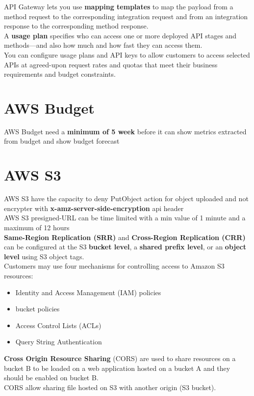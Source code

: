 \documentclass[12pt, letterpaper, twoside]{article}
\begin{document}
API Gateway lets you use \textbf{mapping templates} to map the payload from a method request to the corresponding integration request and 
from an integration response to the corresponding method response.\\

A \textbf{usage plan} specifies who can access one or more deployed API stages and methods—and also how much and how fast they can access them.\\ 
You can configure usage plans and API keys to allow customers to access selected APIs at agreed-upon request rates and quotas 
that meet their business requirements and budget constraints.\\

\section{AWS Budget}
AWS Budget need a \textbf{minimum of 5 week} before it can show metrics extracted from budget and 
show budget forecast

\section{AWS S3}
AWS S3 have the capacity to deny PutObject action for object uploaded and not encrypter with
\textbf{x-amz-server-side-encryption} api header\\

AWS S3 presigned-URL can be time limited with a min value of 1 minute and a maximum of 12 hours\\

\textbf{Same-Region Replication (SRR)} and \textbf{Cross-Region Replication (CRR)} can be configured at 
the S3 \textbf{bucket level}, a \textbf{shared prefix level}, or an \textbf{object level} using S3 object tags.\\

Customers may use four mechanisms for controlling access to Amazon S3 resources: 
\begin{itemize}
	\item Identity and Access Management (IAM) policies
	\item bucket policies
	\item Access Control Lists (ACLs)
	\item Query String Authentication 
\end{itemize}

\textbf{Cross Origin Resource Sharing} (CORS) are used to share resources on a bucket B to be loaded on a web application
hosted on a bucket A and they should be enabled on bucket B.\\
CORS allow sharing file hosted on S3 with another origin (S3 bucket).\\
\end{document}
